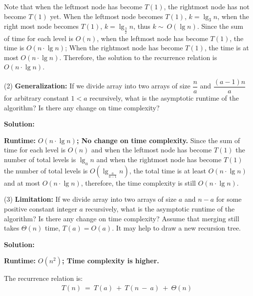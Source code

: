\documentclass{article}
\begin{document}
\par Note that when the leftmost node has become  $T(1)$, the rightmost node has not become $T(1)$ yet. When the leftmost node becomes $T(1)$, $k = \lg_3 n$, when the right most node becomes $T(1)$, $k = \lg_{\frac{3}{2}} n$, thus $k \sim\ O(\lg n)$. Since the sum of time for each level is $O(n)$, when the leftmost node has become $T(1)$, the time is $O(n\cdot \lg n)$; When the rightmost node has become $T(1)$, the time is at most $O(n\cdot \lg n)$. Therefore, the solution to the recurrence relation is $O(n\cdot \lg n)$.
\pagebreak

(2) \textbf{Generalization:} If we divide array into two arrays of size $\dfrac{n}{a}$ and $\dfrac{(a-1)n}{a}$ for arbitrary constant $1<a$ recursively, what is the asymptotic runtime of the algorithm? Is there any change on time complexity?
\par\textbf{Solution:}
\par\textbf{Runtime: }\boldmath$O(n \cdot \lg n)$\unboldmath\textbf{; No change on time complexity.} Since the sum of time for each level is $O(n)$ and when the leftmost node has become $T(1)$ the number of total levels is $\lg_a n$ and when the rightmost node has become $T(1)$ the number of total levels is $O(\lg_{\frac{a}{a-1}} n)$, the total time is at least $O(n \cdot \lg n)$ and at most $O(n \cdot \lg n)$, therefore, the time complexity is still $O(n \cdot \lg n)$.
\vspace{4em}

(3) \textbf{Limitation:} If we divide array into two arrays of size $a$ and $n-a$ for some positive constant integer $a$ recursively, what is the asymptotic runtime of the algorithm? Is there any change on time complexity? Assume that merging still takes $\Theta(n)$ time, $T(a)=O(a)$. It may help to draw a new recursion tree.
\par\textbf{Solution:}
\par\textbf{Runtime: }\boldmath$O(n^2)$\unboldmath\textbf{; Time complexity is higher.}
\par The recurrence relation is:
\begin{align*}
	T(n)\ = \ T(a)\ +\ T(n\ -\ a)\ +\ \Theta(n)
\end{align*}
\end{document}
